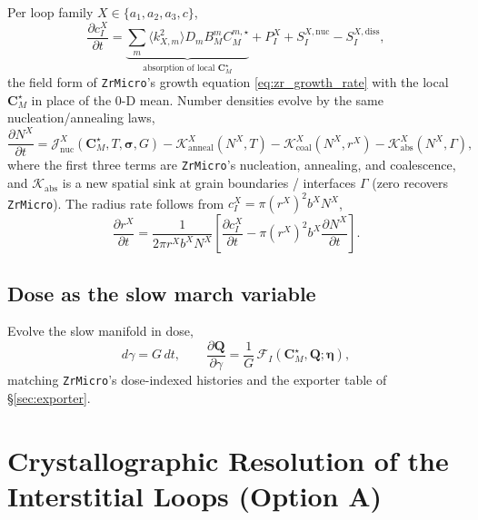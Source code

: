 \documentclass[11pt]{article}
\newcommand{\CM}{\mathbf{C}_{M}}
\newcommand{\sig}{\bm{\sigma}}
\newcommand{\ZrMicro}{\texttt{ZrMicro}}
\begin{document}
Per loop family $X\in\{a_1,a_2,a_3,c\}$,
\begin{equation}
\label{eq:slow_content_component}
    \frac{\partial c_{I}^{X}}{\partial t}
    =
    \underbrace{\sum_{m}\langle k^2_{X,m}\rangle D_m B_M^{m} C_M^{m,\star}}_{\text{absorption of local }\CM^\star}
    + P_I^{X} + S_I^{X,\mathrm{nuc}} - S_I^{X,\mathrm{diss}},
\end{equation}
the field form of \ZrMicro{}'s growth equation \eqref{eq:zr_growth_rate} with the
local $\CM^\star$ in place of the 0-D mean. Number densities evolve by the same
nucleation/annealing laws,
\begin{equation}
\label{eq:nucleation_law}
    \frac{\partial N^{X}}{\partial t}
    =
    \mathcal{J}^{X}_{\mathrm{nuc}}(\CM^{\star},T,\sig,G)
    - \mathcal{K}^{X}_{\mathrm{anneal}}(N^{X},T)
    - \mathcal{K}^{X}_{\mathrm{coal}}(N^{X},r^{X})
    - \mathcal{K}^{X}_{\mathrm{abs}}(N^{X},\Gamma),
\end{equation}
where the first three terms are \ZrMicro{}'s nucleation, annealing, and
coalescence, and $\mathcal K_{\mathrm{abs}}$ is a new spatial sink at grain
boundaries / interfaces $\Gamma$ (zero recovers \ZrMicro{}). The radius rate
follows from $c_I^{X}=\pi(r^{X})^2 b^{X}N^{X}$,
\begin{equation}
\label{eq:r_evolution_general}
    \frac{\partial r^{X}}{\partial t}
    =
    \frac{1}{2\pi r^{X}b^{X}N^{X}}
    \left[\frac{\partial c_{I}^{X}}{\partial t} - \pi (r^{X})^{2}b^{X}\frac{\partial N^{X}}{\partial t}\right].
\end{equation}

\subsection{Dose as the slow march variable}

Evolve the slow manifold in dose,
\begin{equation}
\label{eq:dose_slow_update}
    d\gamma = G\,dt,
    \qquad
    \frac{\partial \mathbf{Q}}{\partial \gamma}
    = \frac{1}{G}\,\mathcal{F}_{I}(\CM^{\star},\mathbf{Q};\bm{\eta}),
\end{equation}
matching \ZrMicro{}'s dose-indexed histories and the exporter table of
\S\ref{sec:exporter}.

\section{Crystallographic Resolution of the Interstitial Loops (Option A)}
\label{sec:resolution}
\end{document}

